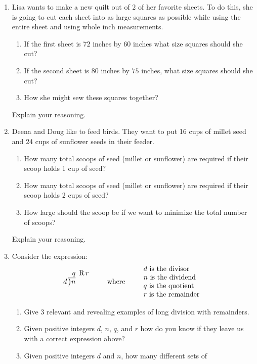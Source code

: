 \begin{problems}
\begin{enumerate}
\item Lisa wants to make a new quilt out of $2$ of her favorite
  sheets. To do this, she is going to cut each sheet into as large
  squares as possible while using the entire sheet and using whole
  inch measurements. 
\begin{enumerate}
\item If the first sheet is $72$ inches by $60$ inches what size
  squares should she cut? 
\item If the second sheet is $80$ inches by $75$ inches, what size
  squares should she cut? 
\item How she might sew these squares together? 
\end{enumerate}
Explain your reasoning.
\item Deena and Doug like to feed birds. They want to put 16 cups of
  millet seed and 24 cups of sunflower seeds in their feeder.
\begin{enumerate}
\item How many total scoops of seed (millet or sunflower) are required
  if their scoop holds 1 cup of seed?
\item How many total scoops of seed (millet or sunflower) are required
  if their scoop holds 2 cups of seed?
\item How large should the scoop be if we want to minimize the total
  number of scoops?
\end{enumerate}
Explain your reasoning.
\item Consider the expression:
\[
d\,\begin{tabular}[b]{@{}r@{} r}
$q$ &\, R\,$r$\\ \cline{1-1}
\big)\begin{tabular}[t]{@{}l@{}}
$n$ 
\end{tabular}
\end{tabular}
\qquad\text{where}\qquad
\begin{tabular}{l}
$d$ is the divisor \\
$n$ is the dividend \\
$q$ is the quotient \\
$r$ is the remainder
\end{tabular}
\]
\begin{enumerate}
\item Give $3$ relevant and revealing examples of long division with
  remainders.
\item Given positive integers $d$, $n$, $q$, and $r$ how do you know
  if they leave us with a correct expression above?
\item Given positive integers $d$ and $n$, how many different sets of

\end{enumerate}
\end{enumerate}
\end{problems}
